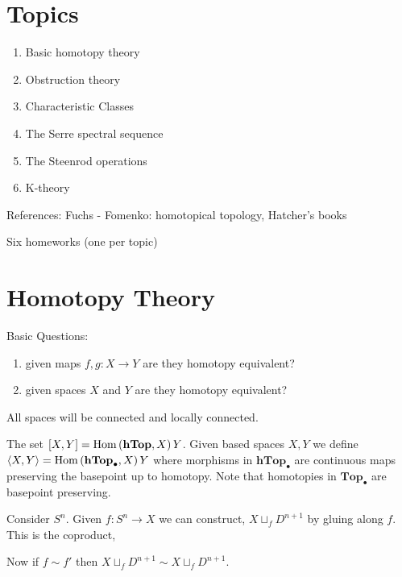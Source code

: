 \documentclass[12pt]{extarticle}
\begin{document}
\section{Topics}

\begin{enumerate}
\item Basic homotopy theory
\item Obstruction theory
\item Characteristic Classes
\item The Serre spectral sequence
\item The Steenrod operations
\item K-theory
\end{enumerate}

References: Fuchs - Fomenko: homotopical topology, Hatcher's books

Six homeworks (one per topic)

\section{Homotopy Theory}

Basic Questions: 

\begin{enumerate}
\item given maps $f, g : X \to Y$ are they homotopy equivalent?
\item given spaces $X$ and $Y$ are they homotopy equivalent? 
\end{enumerate}

\begin{remark}
All spaces will be connected and locally connected. 
\end{remark}

\begin{definition}
The set $[X, Y] = \mathrm{Hom}\left( \mathbf{hTop}, X \right){Y}$. Given based spaces $X, Y$ we define $\left< X, Y \right> = \mathrm{Hom}\left( \mathbf{hTop}_{\bullet}, X \right){Y}$ where morphisms in $\mathbf{hTop}_\bullet$ are continuous maps preserving the basepoint up to homotopy. Note that homotopies in $\mathbf{Top}_\bullet$ are basepoint preserving.
\end{definition}

\begin{example}
Consider $S^n$. Given $f : S^n \to X$ we can construct, $X \sqcup_f D^{n+1}$ by gluing along $f$. This is the coproduct,
\begin{center}
\end{center}
Now if $f \sim f'$ then $X \sqcup_f D^{n+1} \sim X \sqcup_f D^{n+1}$. 
\end{example}
\end{document}
